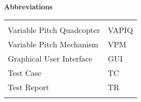 \begin{center}
\textbf{\large Abbreviations}\\
\vspace*{0.2cm}
\begin{tabular}{ll}
\rowcolor{cadetgrey}
    &   \\
Variable Pitch Quadcopter & VAPIQ\\\rowcolor{gainsboro}
Variable Pitch Mechanism & VPM \\
Graphical User Interface & GUI \\ \rowcolor{gainsboro}
Test Case & TC \\
Test Report &TR \\ \rowcolor{gainsboro}
\end{tabular}                                                             
\end{center}

\newpage


\setcounter{section}{0}
\setcounter{secnumdepth}{2}

\startcontents  
\setcounter{tocdepth}{2}
\chapter*{\contentsname}

\vspace*{1cm}

\vspace*{1cm}
\newpage





\newpage


\newpage


\newpage


\newpage


\newpage


\newpage


\newpage


\newpage


\newpage


\newpage


\newpage


%


\stopcontents
{}
